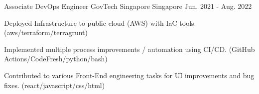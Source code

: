 \begin{cventries}
  \cventry
    {Associate DevOps Engineer} %
    {GovTech Singapore} %
    {Singapore} %
    {Jun. 2021 - Aug. 2022} %
    {
      \begin{cvitems} %
        \item {Deployed Infrastructure to public cloud (AWS) with IaC tools. (aws/terraform/terragrunt)}
        \item {Implemented multiple process improvements / automation using CI/CD. (GitHub Actions/CodeFresh/python/bash)}
        \item {Contributed to various Front-End engineering tasks for UI improvements and bug fixes. (react/javascript/css/html)}
      \end{cvitems}
    }






\end{cventries}
